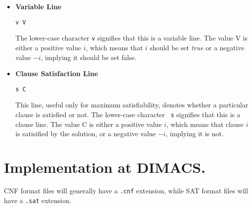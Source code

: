 \documentclass[12pt]{article}
\begin{document}
\begin{itemize}
\item{\bf Variable Line}
\begin{verbatim}
v V
\end{verbatim}

The lower-case character {\tt v} signifies that this is a variable
line.  The value V is either a positive value $i$, which means that
$i$ should be set {\it true} or a negative value $-i$, implying it
should be set false.

\item{\bf Clause Satisfaction Line}
\begin{verbatim}
s C
\end{verbatim}

This line, useful only for maximum satisfiability, denotes whether a
particular clause is satisfied or not.  The lower-case character {\tt
  s} signifies that this is a clause line.  The value C is either a
positive value $i$, which means that clause $i$ is satisified by the
solution, or a negative value $-i$, implying it is not.

\end{itemize}

\section{Implementation at DIMACS.}  CNF format
files will generally have a {\tt .cnf} extension, while SAT format
files will have a {\tt .sat} extension.
\end{document}

